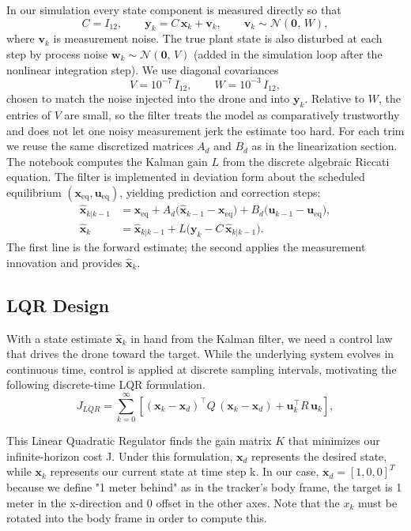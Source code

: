 \documentclass[11pt]{amsart}
\begin{document}
In our simulation every state component is measured directly so that
\[
C = I_{12},
\qquad
\mathbf{y}_k = C\,\mathbf{x}_k + \mathbf{v}_k,
\qquad
\mathbf{v}_k \sim \mathcal{N}(\mathbf{0},\,W),
\]
where $\mathbf{v}_k$ is measurement noise. The true plant state is also disturbed at each step by process noise $\mathbf{w}_k \sim \mathcal{N}(\mathbf{0},\,V)$ (added in the simulation loop after the nonlinear integration step). We use diagonal covariances
\[
V = 10^{-7}\, I_{12},
\qquad
W = 10^{-3}\, I_{12},
\]
chosen to match the noise injected into the drone and into $\mathbf{y}_k$. Relative to $W$, the entries of $V$ are small, so the filter treats the model as comparatively trustworthy and does not let one noisy measurement jerk the estimate too hard.
For each trim we reuse the same discretized matrices $A_d$ and $B_d$ as in the linearization section. The notebook computes the Kalman gain $L$ from the discrete algebraic Riccati equation. The filter is implemented in deviation form about the scheduled equilibrium $(\mathbf{x}_{\mathrm{eq}},\mathbf{u}_{\mathrm{eq}})$, yielding prediction and correction steps:
\begin{align*}
\hat{\mathbf{x}}_{k|k-1}
&= \mathbf{x}_{\mathrm{eq}}
 + A_d\bigl(\hat{\mathbf{x}}_{k-1} - \mathbf{x}_{\mathrm{eq}}\bigr)
 + B_d\bigl(\mathbf{u}_{k-1} - \mathbf{u}_{\mathrm{eq}}\bigr), \\
\hat{\mathbf{x}}_k
&= \hat{\mathbf{x}}_{k|k-1}
 + L\bigl(\mathbf{y}_k - C\,\hat{\mathbf{x}}_{k|k-1}\bigr).
\end{align*}
The first line is the forward estimate; the second applies the measurement innovation and provides $\hat{\mathbf{x}}_k$.


\subsection{LQR Design}

With a state estimate $\hat{\mathbf{x}}_k$ in hand from the Kalman filter, we need a control law that drives the drone toward the target. While the underlying system evolves in continuous time, control is applied at discrete sampling intervals, motivating the following discrete-time LQR formulation. 
\[
J_{LQR} = \sum_{k=0}^{\infty} \left[(\mathbf{x}_k - \mathbf{x}_d)^\top Q\,(\mathbf{x}_k - \mathbf{x}_d) + \mathbf{u}_k^\top R\,\mathbf{u}_k\right],
\]

This Linear Quadratic Regulator finds the gain matrix $K$ that minimizes our infinite-horizon cost J. Under this formulation, $\mathbf{x}_d$ represents the desired state, while $\mathbf{x}_k$ represents our current state at time step k. In our case, $\mathbf{x}_d = [1, 0, 0]^T$ because we define "1 meter behind" as in the tracker's body frame, the target is 1 meter in the x-direction and 0 offset in the other axes. Note that the $x_k$ must be rotated into the body frame in order to compute this. 
\end{document}
